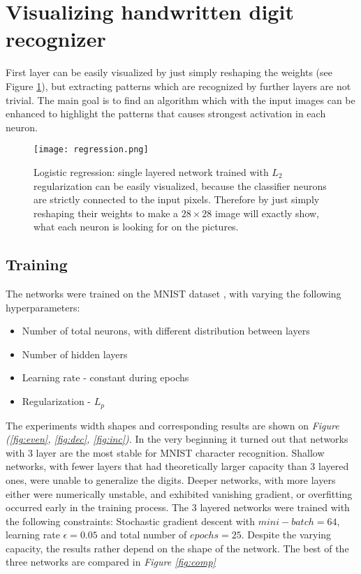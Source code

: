 \clearpage
\section{Visualizing handwritten digit recognizer}
First layer can be easily visualized by just simply reshaping the weights (see Figure \ref{fig:regression}), but extracting patterns which are recognized by further layers are not trivial. The main goal is to find an algorithm which with the input images can be enhanced to highlight the patterns that causes strongest activation in each neuron.


\begin{figure}
    \centering
    \texttt{[image: regression.png]}
    \caption{Logistic regression: single layered network trained with $L_2$ regularization can be easily visualized, because the classifier neurons are strictly connected to the input pixels. Therefore by just simply reshaping their weights to make a $28 \times 28$ image will exactly show, what each neuron is looking for on the pictures.}
    \label{fig:regression}
\end{figure}

\subsection{Training}
\label{train}
The networks were trained on the MNIST dataset \cite{mnist}, with varying the following hyperparameters:
\begin{itemize}
    \item Number of total neurons, with different distribution between layers
    \item Number of hidden layers
    \item Learning rate - constant during epochs
    \item Regularization - $L_p$
\end{itemize}

The experiments width shapes and corresponding results are shown on \emph{Figure (\ref{fig:even}, \ref{fig:dec}, \ref{fig:inc})}.
In the very beginning it turned out that networks with 3 layer are the most stable for MNIST character recognition. 
Shallow networks, with fewer layers that had theoretically larger capacity than 3 layered ones, were unable to generalize the digits.
Deeper networks, with more layers either were numerically unstable, and exhibited vanishing gradient, or overfitting occurred early in the training process.
The 3 layered networks were trained with the following constraints: Stochastic gradient descent with $mini-batch=64$, learning rate $\epsilon = 0.05$ and total number of $epochs=25$.
Despite the varying capacity, the results rather depend on the shape of the network. The best of the three networks are compared in \emph{Figure \ref{fig:comp}} 


